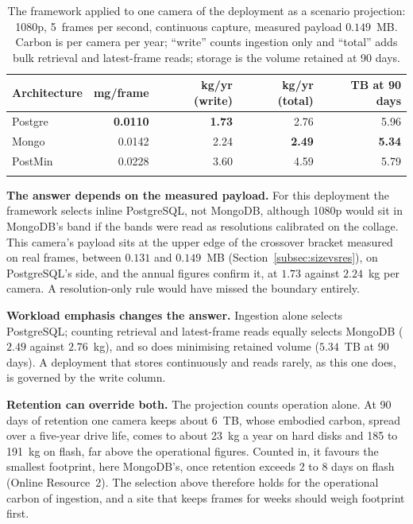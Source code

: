 \documentclass[pdflatex,sn-basic]{sn-jnl}%
\begin{document}
\begin{table}[htbp]
\color{markup}
\caption{The framework applied to one camera of the deployment as a scenario projection: 1080p, 5~frames per second, continuous capture, measured payload $0.149$~MB. Carbon is per camera per year; ``write'' counts ingestion only and ``total'' adds bulk retrieval and latest-frame reads; storage is the volume retained at 90 days.}\label{tab:applied}
\small
\begin{tabular}{@{}lrrrr@{}}
\toprule
Architecture & mg/frame & kg/yr (write) & kg/yr (total) & TB at 90 days \\
\midrule
Postgre & \textbf{0.0110} & \textbf{1.73} & 2.76 & 5.96 \\
Mongo   & 0.0142 & 2.24 & \textbf{2.49} & \textbf{5.34} \\
PostMin & 0.0228 & 3.60 & 4.59 & 5.79 \\
\botrule
\end{tabular}
\end{table}

{\color{markup}\textbf{The answer depends on the measured payload.} For this deployment the framework selects inline PostgreSQL, not MongoDB, although 1080p would sit in MongoDB's band if the bands were read as resolutions calibrated on the collage.} {\color{markup}This camera's payload sits at the upper edge of the crossover bracket measured on real frames, between $0.131$ and $0.149$~MB (Section~\ref{subsec:sizevsres}), on PostgreSQL's side, and the annual figures confirm it, at $1.73$ against $2.24$~kg per camera.} {\color{markup}A resolution-only rule would have missed the boundary entirely.}

{\color{markup}\textbf{Workload emphasis changes the answer.} Ingestion alone selects PostgreSQL; counting retrieval and latest-frame reads equally selects MongoDB ($2.49$ against $2.76$~kg), and so does minimising retained volume ($5.34$~TB at 90 days).} {\color{markup}A deployment that stores continuously and reads rarely, as this one does, is governed by the write column.}

{\color{markup}\textbf{Retention can override both.} The projection counts operation alone.} {\color{markup}At 90 days of retention one camera keeps about 6~TB, whose embodied carbon, spread over a five-year drive life, comes to about 23~kg a year on hard disks and 185 to 191~kg on flash, far above the operational figures.} {\color{markup}Counted in, it favours the smallest footprint, here MongoDB's, once retention exceeds 2 to 8 days on flash (Online Resource~2).} {\color{markup}The selection above therefore holds for the operational carbon of ingestion, and a site that keeps frames for weeks should weigh footprint first.}
\end{document}

